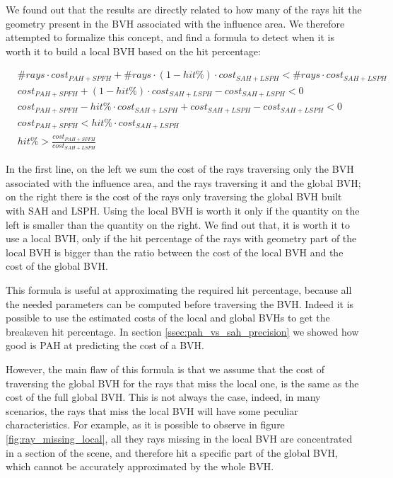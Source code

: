 \documentclass{PoliMi_MasterThesis}
\begin{document}
We found out that the results are directly related to how many of the rays hit the geometry present in the BVH associated with the influence area. We therefore attempted to formalize this concept, and find a formula to detect when it is worth it to build a local BVH based on the hit percentage:

\begin{subequations}
	\begin{align*}
		&\#rays \cdot cost_{PAH+SPFH} + \#rays \cdot (1-hit\%) \cdot cost_{SAH+LSPH} < \#rays \cdot cost_{SAH+LSPH}\\
		&cost_{PAH+SPFH} + (1-hit\%) \cdot cost_{SAH+LSPH} - cost_{SAH+LSPH} < 0\\
		&cost_{PAH+SPFH} - hit\% \cdot cost_{SAH+LSPH} + cost_{SAH+LSPH} - cost_{SAH+LSPH} < 0\\
		&cost_{PAH+SPFH} < hit\% \cdot cost_{SAH+LSPH}\\
		&hit\% > \frac{cost_{PAH+SPFH}}{cost_{SAH+LSPH}}
	\end{align*}
\end{subequations}

In the first line, on the left we sum the cost of the rays traversing only the BVH associated with the influence area, and the rays traversing it and the global BVH; on the right there is the cost of the rays only traversing the global BVH built with SAH and LSPH. Using the local BVH is worth it only if the quantity on the left is smaller than the quantity on the right. We find out that, it is worth it to use a local BVH, only if the hit percentage of the rays with geometry part of the local BVH is bigger than the ratio between the cost of the local BVH and the cost of the global BVH.

This formula is useful at approximating the required hit percentage, because all the needed parameters can be computed before traversing the BVH. Indeed it is possible to use the estimated costs of the local and global BVHs to get the breakeven hit percentage. In section \ref{ssec:pah_vs_sah_precision} we showed how good is PAH at predicting the cost of a BVH.

However, the main flaw of this formula is that we assume that the cost of traversing the global BVH for the rays that miss the local one, is the same as the cost of the full global BVH. This is not always the case, indeed, in many scenarios, the rays that miss the local BVH will have some peculiar characteristics. For example, as it is possible to observe in figure \ref{fig:ray_missing_local}, all they rays missing in the local BVH are concentrated in a section of the scene, and therefore hit a specific part of the global BVH, which cannot be accurately approximated by the whole BVH.
\end{document}
